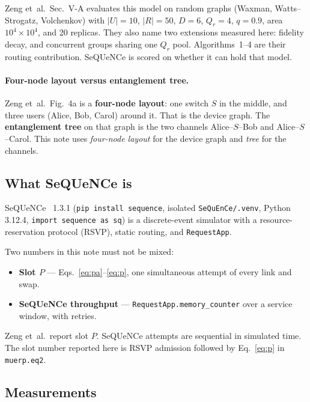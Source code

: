 \documentclass[11pt]{article}
\begin{document}
Zeng et~al.\ Sec.~V-A evaluates this model on random graphs (Waxman, Watts--Strogatz, Volchenkov) with $|U|=10$, $|R|=50$, $D=6$, $Q_r=4$, $q=0.9$, area $10^4\times 10^4$, and 20 replicas.
They also name two extensions measured here: fidelity decay, and concurrent groups sharing one $Q_r$ pool.
Algorithms~1--4 are their routing contribution.
SeQUeNCe is scored on whether it can hold that model.

\paragraph{Four-node layout versus entanglement tree.}
Zeng et~al.\ Fig.~4a is a \textbf{four-node layout}: one switch $S$ in the middle, and three users (Alice, Bob, Carol) around it.
That is the device graph.
The \textbf{entanglement tree} on that graph is the two channels Alice--$S$--Bob and Alice--$S$--Carol.
This note uses \emph{four-node layout} for the device graph and \emph{tree} for the channels.

\subsection{What SeQUeNCe is}

SeQUeNCe~\cite{sequence} 1.3.1 (\texttt{pip install sequence}, isolated \texttt{SeQuEnCe/.venv}, Python 3.12.4, \texttt{import sequence as sq}) is a discrete-event simulator with a resource-reservation protocol (RSVP), static routing, and \texttt{RequestApp}.

Two numbers in this note must not be mixed:
\begin{itemize}
\item \textbf{Slot $P$} --- Eqs.~\eqref{eq:pa}--\eqref{eq:p}, one simultaneous attempt of every link and swap.
\item \textbf{SeQUeNCe throughput} --- \texttt{RequestApp.memory\_counter} over a service window, with retries.
\end{itemize}
Zeng et~al.\ report slot $P$.
SeQUeNCe attempts are sequential in simulated time.
The slot number reported here is RSVP admission followed by Eq.~\eqref{eq:p} in \texttt{muerp.eq2}.

\subsection{Measurements}
\end{document}
